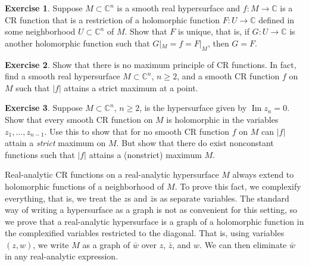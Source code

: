 \documentclass[12pt,openany]{book}
\renewcommand{\Im}{\operatorname{Im}}
\newcommand{\sabs}[1]{\lvert {#1} \rvert}
\newcommand{\C}{{\mathbb{C}}}
\theoremstyle{plain}
\theoremstyle{remark}
\theoremstyle{definition}
\newenvironment{exbox}{%
    \def\FrameCommand{\vrule width 1pt \relax\hspace{10pt}}%
    \MakeFramed{\advance\hsize-\width\FrameRestore}%
}{%
    \endMakeFramed
}
\theoremstyle{exercise}
\newtheorem{exercise}{Exercise}[section]
\theoremstyle{example}
\begin{document}
\begin{exbox}
\begin{exercise}
Suppose $M \subset \C^n$ is a smooth real hypersurface
and $f \colon M \to \C$ is a CR function that is a restriction
of a holomorphic function $F \colon U \to \C$ defined in
some neighborhood $U \subset \C^n$ of $M$.  Show that $F$ is unique,
that is, if $G \colon U \to \C$ is another holomorphic function such that
$G|_M = f = F|_M$, then $G=F$.
\end{exercise}

\begin{exercise}
Show that there is no maximum principle of CR functions.  In fact, find a
smooth real hypersurface $M \subset \C^n$, $n \geq 2$, and a smooth CR function
$f$ on $M$ such that $\sabs{f}$ attains a strict maximum at a point.
\end{exercise}

\begin{exercise}
Suppose $M \subset \C^n$, $n \geq 2$, is the hypersurface given by $\Im z_n
= 0$.  Show that every smooth CR function on $M$ is holomorphic in the variables
$z_1,\ldots,z_{n-1}$.  Use this to show that for no smooth CR function $f$ on $M$ can
$\sabs{f}$ attain a \emph{strict} maximum on $M$.  But show that there do
exist nonconstant functions such that $\sabs{f}$ attains a (nonstrict) maximum $M$.
\end{exercise}
\end{exbox}

Real-analytic CR functions on a real-analytic
hypersurface $M$ always extend to holomorphic functions of a neighborhood of $M$.
To prove this fact, we complexify everything, that is, we treat the
$z$s and $\bar{z}$s as separate variables.  The standard way of
writing a hypersurface as a graph is not as convenient for this setting, so
we prove that a real-analytic hypersurface is a
graph of a holomorphic function in the complexified variables restricted to
the diagonal.  That is,
using variables $(z,w)$,
we write $M$ as a graph of $\bar{w}$ over $z$, $\bar{z}$, and $w$.
We can then eliminate $\bar{w}$ in any real-analytic
expression.
\end{document}
